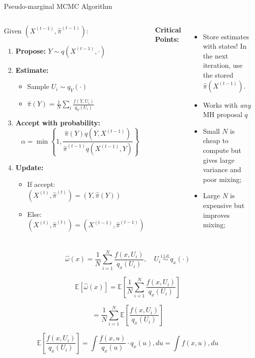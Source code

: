 \begin{frame}{Pseudo-marginal MCMC Algorithm}
	\begin{columns}

		\begin{block}{Given $(X^{(t-1)}, \hat{\pi}^{(t-1)})$:}
			\begin{enumerate}
				\item \textbf{Propose:} $Y \sim q(X^{(t-1)}, \cdot)$
				\item \textbf{Estimate:}
				      \begin{itemize}
					      \item Sample $U_i \sim q_Y(\cdot)$
					      \item $\hat{\pi}(Y) = \frac{1}{N}\sum_{i} \frac{f(Y,U_i)}{q_Y(U_i)}$
				      \end{itemize}
				\item \textbf{Accept with probability:}
				      $$\alpha = \min\left\{1, \frac{\hat{\pi}(Y)q(Y,X^{(t-1)})}{\hat{\pi}^{(t-1)}q(X^{(t-1)},Y)}\right\}$$
				\item \textbf{Update:}
				      \begin{itemize}
					      \item If accept: $(X^{(t)}, \hat{\pi}^{(t)}) = (Y, \hat{\pi}(Y))$
					      \item Else: $(X^{(t)}, \hat{\pi}^{(t)}) = (X^{(t-1)}, \hat{\pi}^{(t-1)})$
				      \end{itemize}
			\end{enumerate}
		\end{block}

		\textcolor{copenhagenred}{\textbf{Critical Points:}}
		\begin{itemize}
			\item Store estimates with states! In the next iteration, use the stored $\hat{\pi}(X^{(t-1)})$.
			\item Works with \textit{any} MH proposal $q$
			\item Small $N$ is cheap to compute but gives large variance and poor mixing;
			\item Large $N$ is expensive but improves mixing;
		\end{itemize}
	\end{columns}
\end{frame}


\begin{frame}
	$$\hat{\omega}(x) = \frac{1}{N} \sum_{i=1}^{N} \frac{f(x, U_i)}{q_x(U_i)}, \quad U_i \overset{\text{i.i.d.}}{\sim} q_x(\cdot)$$



	$$\mathbb{E}[\hat{\omega}(x)] = \mathbb{E}\left[\frac{1}{N} \sum_{i=1}^{N} \frac{f(x, U_i)}{q_x(U_i)}\right]$$


	$$= \frac{1}{N} \sum_{i=1}^{N} \mathbb{E}\left[\frac{f(x, U_i)}{q_x(U_i)}\right]$$

	$$\mathbb{E}\left[\frac{f(x, U_i)}{q_x(U_i)}\right] = \int \frac{f(x, u)}{q_x(u)} \cdot q_x(u) , du = \int f(x, u) , du$$
\end{frame}
